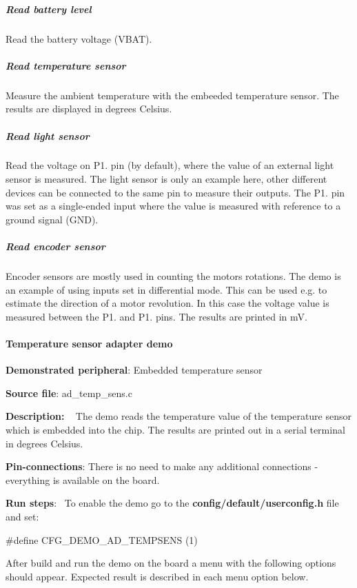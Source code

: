 \subparagraph*{Read battery level}

Read the battery voltage (V\+B\+A\+T).

\subparagraph*{Read temperature sensor}

Measure the ambient temperature with the embeeded temperature sensor. The results are displayed in degrees Celsius.

\subparagraph*{Read light sensor}

Read the voltage on P1. pin (by default), where the value of an external light sensor is measured. The light sensor is only an example here, other different devices can be connected to the same pin to measure their outputs. The P1. pin was set as a single-\/ended input where the value is measured with reference to a ground signal (G\+N\+D).

\subparagraph*{Read encoder sensor}

Encoder sensors are mostly used in counting the motors\textquotesingle{} rotations. The demo is an example of using inputs set in differential mode. This can be used e.\+g. to estimate the direction of a motor revolution. In this case the voltage value is measured between the P1. and P1. pins. The results are printed in m\+V.

\paragraph*{Temperature sensor adapter demo}


\begin{DoxyItemize}
\item {\bfseries Demonstrated peripheral}\+: Embedded temperature sensor
\item {\bfseries Source file}\+: ad\+\_\+temp\+\_\+sens.\+c
\item {\bfseries Description\+:} ~\newline
 The demo reads the temperature value of the temperature sensor which is embedded into the chip. The results are printed out in a serial terminal in degrees Celsius.
\item {\bfseries Pin-\/connections}\+: There is no need to make any additional connections -\/ everything is available on the board.
\item {\bfseries Run steps}\+:~\newline
 To enable the demo go to the {\bfseries {\ttfamily config/default/userconfig.\+h}} file and set\+: 
\begin{DoxyCode}
\textcolor{preprocessor}{#define CFG\_DEMO\_AD\_TEMPSENS      (1)}
\end{DoxyCode}
 After build and run the demo on the board a menu with the following options should appear. Expected result is described in each menu option below.
\end{DoxyItemize}

